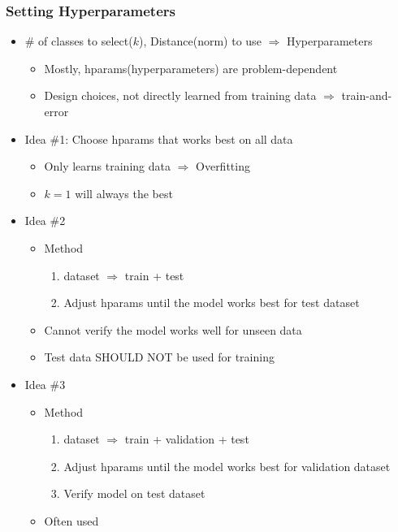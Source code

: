 \subsubsection*{Setting Hyperparameters}
\begin{itemize}
    \item \# of classes to select($k$), Distance(norm) to use $\Rightarrow$ Hyperparameters
    \begin{itemize}
        \item Mostly, hparams(hyperparameters) are problem-dependent
        \item Design choices, not directly learned from training data $\Rightarrow$ train-and-error
    \end{itemize}
    \item Idea \#1: Choose hparams that works best on all data
    \begin{itemize}
        \item Only learns training data $\Rightarrow$ Overfitting
        \item $k=1$ will always the best
    \end{itemize}
    \item Idea \#2
    \begin{itemize}
        \item Method
        \begin{enumerate}
            \item dataset $\Rightarrow$ train + test
            \item Adjust hparams until the model works best for test dataset
        \end{enumerate}
        \item Cannot verify the model works well for unseen data
        \item Test data SHOULD NOT be used for training
    \end{itemize}
    \item Idea \#3
    \begin{itemize}
        \item Method
        \begin{enumerate}
            \item dataset $\Rightarrow$ train + validation + test
            \item Adjust hparams until the model works best for validation dataset
            \item Verify model on test dataset
        \end{enumerate}
        \item Often used

\end{itemize}
\end{itemize}
